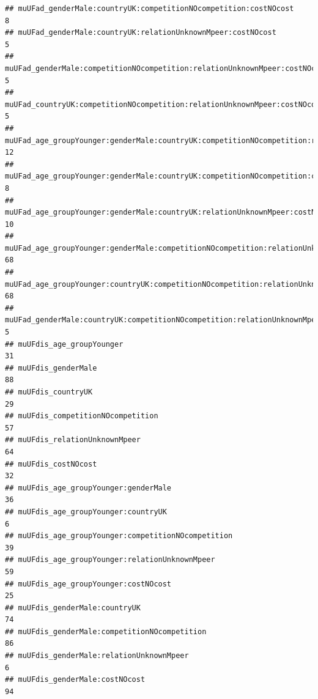 \documentclass[
]{article}
\begin{document}
\begin{verbatim}
## muUFad_genderMale:countryUK:competitionNOcompetition:costNOcost                                     8
## muUFad_genderMale:countryUK:relationUnknownMpeer:costNOcost                                         5
## muUFad_genderMale:competitionNOcompetition:relationUnknownMpeer:costNOcost                          5
## muUFad_countryUK:competitionNOcompetition:relationUnknownMpeer:costNOcost                           5
## muUFad_age_groupYounger:genderMale:countryUK:competitionNOcompetition:relationUnknownMpeer         12
## muUFad_age_groupYounger:genderMale:countryUK:competitionNOcompetition:costNOcost                    8
## muUFad_age_groupYounger:genderMale:countryUK:relationUnknownMpeer:costNOcost                       10
## muUFad_age_groupYounger:genderMale:competitionNOcompetition:relationUnknownMpeer:costNOcost        68
## muUFad_age_groupYounger:countryUK:competitionNOcompetition:relationUnknownMpeer:costNOcost         68
## muUFad_genderMale:countryUK:competitionNOcompetition:relationUnknownMpeer:costNOcost                5
## muUFdis_age_groupYounger                                                                           31
## muUFdis_genderMale                                                                                 88
## muUFdis_countryUK                                                                                  29
## muUFdis_competitionNOcompetition                                                                   57
## muUFdis_relationUnknownMpeer                                                                       64
## muUFdis_costNOcost                                                                                 32
## muUFdis_age_groupYounger:genderMale                                                                36
## muUFdis_age_groupYounger:countryUK                                                                  6
## muUFdis_age_groupYounger:competitionNOcompetition                                                  39
## muUFdis_age_groupYounger:relationUnknownMpeer                                                      59
## muUFdis_age_groupYounger:costNOcost                                                                25
## muUFdis_genderMale:countryUK                                                                       74
## muUFdis_genderMale:competitionNOcompetition                                                        86
## muUFdis_genderMale:relationUnknownMpeer                                                             6
## muUFdis_genderMale:costNOcost                                                                      94

\end{verbatim}
\end{document}
